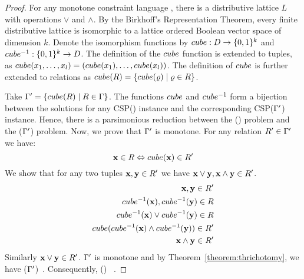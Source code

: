 \begin{proof}
For any monotone constraint language \mrelset, there is a distributive lattice \(L\) with operations
\(\vee\) and \(\wedge\)\@. By the Birkhoff's Representation Theorem, every finite distributive lattice
is isomorphic to a lattice ordered Boolean vector space of dimension \(k\)\@.
Denote the isomorphism functions by \(cube: D \to \{{0,1}\}^k\) and 
\(cube^{-1} : \{{0,1}\}^k\to D\)\@. The definition of the \(cube\) function
is extended to tuples, as \(cube(x_1,\dotsc,x_l)=(cube(x_1),\dotsc,cube(x_l))\)\@.
The definition of \(cube\) is further extended to relations as 
\(cube(R) = \{{cube(\varrho) \mid \varrho \in R}\}\)\@.

Take \(\Gamma'=\{{cube(R)\mid R\in \Gamma}\}\)\@. The functions \(cube\) and
\(cube^{-1}\) form a bijection between the solutions for any CSP(\mrelset) instance and the 
corresponding CSP(\(\Gamma'\)) instance. Hence, there is a parsimonious reduction between 
the \ccsp(\mrelset) problem and the \ccsp(\(\Gamma'\)) problem. Now, we prove that
\(\Gamma'\) is monotone. For any relation \(R' \in \Gamma'\) we have:
\[\textbf{x} \in R \Leftrightarrow cube(\textbf{x}) \in R'\]
We show that for any two tuples \(\textbf{x},\textbf{y}\in R'\) we have 
\(\textbf{x} \vee \textbf{y}, \textbf{x}\wedge\textbf{y}\in R'\).
\begin{eqnarray*}
\textbf{x},\textbf{y} \in R'  \\
cube^{-1}(\textbf{x}),cube^{-1}(\textbf{y})\in R  \\
cube^{-1}(\textbf{x}) \vee cube^{-1}(\textbf{y}) \in R  \\
cube(cube^{-1}(\textbf{x})\wedge cube^{-1}(\textbf{y}))\in R' \\
\textbf{x} \wedge \textbf{y} \in R' \\
\end{eqnarray*}
Similarly \(\textbf{x} \vee \textbf{y} \in R'\)\@.
\(\Gamma'\) is monotone and by Theorem~\ref{theorem:thrichotomy}, we have 
\ccsp(\(\Gamma'\))\maple\ \cbis\@. Consequently, \ccsp(\mrelset) \maple\ \cbis\@.
\end{proof}

